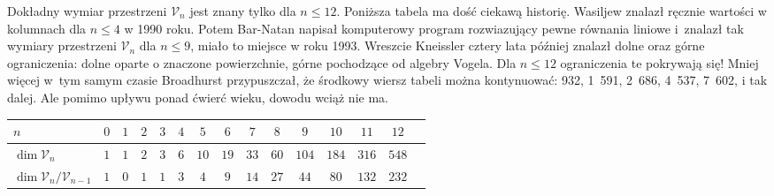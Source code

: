 Dokładny wymiar przestrzeni $\mathcal V_n$ jest znany tylko dla $n \le 12$.
Poniższa tabela ma dość ciekawą historię.
Wasiljew znalazł ręcznie wartości w kolumnach dla $n \le 4$ w 1990 roku.
%
Potem Bar-Natan napisał komputerowy program rozwiazujący pewne równania liniowe i~znalazł tak wymiary przestrzeni $\mathcal V_n$ dla $n \le 9$, miało to miejsce w roku 1993.
%
Wreszcie Kneissler \cite{kneissler97} cztery lata później znalazł dolne oraz górne ograniczenia: dolne oparte o znaczone powierzchnie, górne pochodzące od algebry Vogela.
%
%
Dla $n \le 12$ ograniczenia te pokrywają się!
Mniej więcej w~tym samym czasie Broadhurst \cite{broadhurst97} przypuszczał, że środkowy wiersz tabeli można kontynuować: 932, 1~591, 2~686, 4~537, 7~602, i tak dalej.
Ale pomimo upływu ponad ćwierć wieku, dowodu wciąż nie ma.

{
\renewcommand*{\arraystretch}{1.4} %
\footnotesize
\begin{longtable}{lcccccccccccccc}
\hline
    $n$ & $0$ & $1$ & $2$ & $3$ & $4$ & $5$ & $6$ & $7$ & $8$ & $9$ & $10$ & $11$ & $12$ \\ \hline \endhead
    $\dim \mathcal V_n$ & $1$ & $1$ & $2$ & $3$ & $6$ & $10$ & $19$ & $33$ & $60$ & $104$ & $184$ & $316$ & $548$ \\
    $\dim \mathcal V_n / \mathcal V_{n-1}$ & $1$ & $0$ & $1$ & $1$ & $3$ & $4$ & $9$ & $14$ & $27$ & $44$ & $80$ & $132$ & $232$ \\
    \hline
\end{longtable}
\normalsize
}


